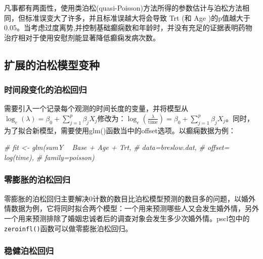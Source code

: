 \documentclass[
]{article}
\newenvironment{Shaded}{\begin{snugshade}}{\end{snugshade}}
\newcommand{\CommentTok}[1]{\textcolor[rgb]{0.56,0.35,0.01}{\textit{#1}}}
\begin{document}
凡事都有两面性，使用类泊松(quasi-Poisson)方法所得的参数估计与泊松方法相同，但标准误变大了许多，并且标准误越大将会导致
Trt (和 Age
)的p值越大于0.05。当考虑过度离势,并控制基础癫痫数和年龄时，并没有充足的证据表明药物治疗相对于使用安慰剂能显著降低癫痫发病次数。

\hypertarget{ux6269ux5c55ux7684ux6ccaux677eux6a21ux578bux53d8ux79cd}{%
\subsection{扩展的泊松模型变种}\label{ux6269ux5c55ux7684ux6ccaux677eux6a21ux578bux53d8ux79cd}}

\hypertarget{ux65f6ux95f4ux6bb5ux53d8ux5316ux7684ux6ccaux677eux56deux5f52}{%
\subsubsection{时间段变化的泊松回归}\label{ux65f6ux95f4ux6bb5ux53d8ux5316ux7684ux6ccaux677eux56deux5f52}}

需要引入一个记录每个观测的时间长度的变量，并将模型从\(\log _{e}(\lambda)=\beta_{0}+\sum_{j=1}^{p} \beta_{j} X_{j}\)修改为：\(\log _{e}\left(\frac{\lambda}{\text {time}}\right)=\beta_{0}+\sum_{j=1}^{p} \beta_{j} X_{j}\)。同时，为了拟合新模型，需要使用glm()函数当中的offset选项。以癫痫数据为例：

\begin{Shaded}
\begin{Highlighting}[]
\CommentTok{# fit <- glm(sumY ~ Base + Age + Trt,}
\CommentTok{#            data=breslow.dat,}
\CommentTok{#            offset= log(time), }
\CommentTok{#            family=poisson)}
\end{Highlighting}
\end{Shaded}

\hypertarget{ux96f6ux81a8ux80c0ux7684ux6ccaux677eux56deux5f52}{%
\subsubsection{零膨胀的泊松回归}\label{ux96f6ux81a8ux80c0ux7684ux6ccaux677eux56deux5f52}}

零膨胀的泊松回归主要解决0计数的数目比泊松模型预测的数目多的问题，以婚外情数据为例，它将同时拟合两个模型：一个用来预测哪些人又会发生婚外情，另外一个用来预测排除了婚姻忠诚者后的调查对象会发生多少次婚外情。pscl包中的\texttt{zeroinfl()}函数可以做零膨胀泊松回归。

\hypertarget{ux7a33ux5065ux6ccaux677eux56deux5f52}{%
\subsubsection{稳健泊松回归}\label{ux7a33ux5065ux6ccaux677eux56deux5f52}}
\end{document}
